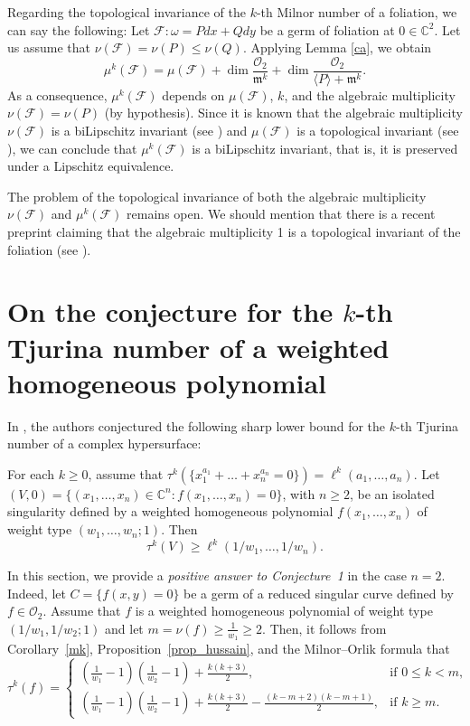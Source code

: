 \documentclass[12pt,letterpaper]{amsart}
\newcommand{\C}{\mathbb{C}}
\newcommand{\F}{\mathcal{F}}
\newcommand{\m}{\mathfrak{m}}
\begin{document}
\par Regarding the topological invariance of the $k$-th Milnor number of a foliation, we can say the following:
Let $\F:\omega=Pdx+Qdy$ be a germ of foliation at $0\in\C^2$. Let us assume that $\nu(\F)=\nu(P)\leq\nu(Q)$. Applying Lemma \ref{ca}, we obtain
\begin{equation*}
    \mu^{k}(\F)=\mu(\F)+\dim\frac{\mathcal{O}_2}{\m^k}+\dim\frac{\mathcal{O}_2}{\langle P\rangle+\m^k}.
\end{equation*}
As a consequence, $\mu^{k}(\F)$ depends on $\mu(\F)$, $k$, and the algebraic multiplicity $\nu(\F)=\nu(P)$ (by hypothesis). 
Since it is known that the algebraic multiplicity $\nu(\F)$ is a biLipschitz invariant (see \cite{Rudy}) and $\mu(\F)$ is a topological invariant (see \cite{CLS}), we can conclude that $\mu^{k}(\F)$ is a biLipschitz invariant, that is, it is preserved under a Lipschitz equivalence. 

\par The problem of the topological invariance of both the algebraic multiplicity $\nu(\F)$ and $\mu^{k}(\F)$ remains open. We should mention that there is a recent preprint claiming that the algebraic multiplicity 1 is a topological invariant of the foliation (see \cite{Camara}).

\section{On the conjecture for the $k$-th Tjurina number of a weighted homogeneous polynomial}\label{conjecture_lower}

In \cite[Conjecture 1.1]{k-Milnor}, the authors conjectured the following sharp lower bound for the $k$-th Tjurina number of a complex hypersurface:

For each $k \geq 0$, assume that $\tau^{k}(\{x_1^{a_1}+\ldots+x_n^{a_n}=0\})=\ell^k(a_1,\ldots,a_n)$.  
Let $(V,0)=\{(x_1,\ldots,x_n)\in\C^n : f(x_1,\ldots,x_n)=0\}$, with $n\geq 2$, be an isolated singularity defined by a weighted homogeneous polynomial $f(x_1,\ldots,x_n)$ of weight type $(w_1,\ldots,w_n;1)$. Then
\[
\tau^{k}(V)\geq\ell^{k}(1/w_1,\ldots,1/w_n).
\]

In this section, we provide a \textit{positive answer to Conjecture~1} in the case $n=2$.  
Indeed, let $C=\{f(x,y)=0\}$ be a germ of a reduced singular curve defined by $f\in\mathcal{O}_2$.  
Assume that $f$ is a weighted homogeneous polynomial of weight type $(1/w_1,1/w_2;1)$ and let $m=\nu(f)\geq\frac{1}{w_1}\geq 2$.  
Then, it follows from Corollary~\ref{mk}, Proposition~\ref{prop_hussain}, and the Milnor–Orlik formula \cite{Orlik} that
\[
\tau^k(f)=
\begin{cases}
\left(\frac{1}{w_1}-1\right)\left(\frac{1}{w_2}-1\right)+\frac{k(k+3)}{2}, & \text{if } 0\leq k< m, \\[4pt]
\left(\frac{1}{w_1}-1\right)\left(\frac{1}{w_2}-1\right)+\frac{k(k+3)}{2}-\frac{(k-m+2)(k-m+1)}{2}, & \text{if } k\geq m.
\end{cases}
\]
\end{document}
